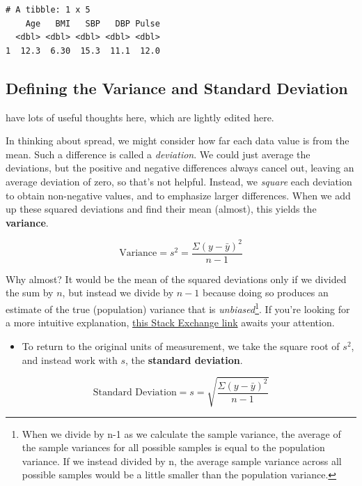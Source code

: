 \documentclass[
]{book}
\providecommand{\tightlist}{%
  \setlength{\itemsep}{0pt}\setlength{\parskip}{0pt}}
\begin{document}
\begin{verbatim}
# A tibble: 1 x 5
    Age   BMI   SBP   DBP Pulse
  <dbl> <dbl> <dbl> <dbl> <dbl>
1  12.3  6.30  15.3  11.1  12.0
\end{verbatim}

\hypertarget{defining-the-variance-and-standard-deviation}{%
\subsection{Defining the Variance and Standard Deviation}\label{defining-the-variance-and-standard-deviation}}

\citet{BockVD} have lots of useful thoughts here, which are lightly edited here.

In thinking about spread, we might consider how far each data value is from the mean. Such a difference is called a \emph{deviation}. We could just average the deviations, but the positive and negative differences always cancel out, leaving an average deviation of zero, so that's not helpful. Instead, we \emph{square} each deviation to obtain non-negative values, and to emphasize larger differences. When we add up these squared deviations and find their mean (almost), this yields the \textbf{variance}.

\[
\mbox{Variance} = s^2 = \frac{\Sigma (y - \bar{y})^2}{n-1}
\]

Why almost? It would be the mean of the squared deviations only if we divided the sum by \(n\), but instead we divide by \(n-1\) because doing so produces an estimate of the true (population) variance that is \emph{unbiased}\footnote{When we divide by n-1 as we calculate the sample variance, the average of the sample variances for all possible samples is equal to the population variance. If we instead divided by n, the average sample variance across all possible samples would be a little smaller than the population variance.}. If you're looking for a more intuitive explanation, \href{http://stats.stackexchange.com/questions/3931/intuitive-explanation-for-dividing-by-n-1-when-calculating-standard-deviation}{this Stack Exchange link} awaits your attention.

\begin{itemize}
\tightlist
\item
  To return to the original units of measurement, we take the square root of \(s^2\), and instead work with \(s\), the \textbf{standard deviation}.
\end{itemize}

\[
\mbox{Standard Deviation} = s = \sqrt{\frac{\Sigma (y - \bar{y})^2}{n-1}}
\]
\end{document}
